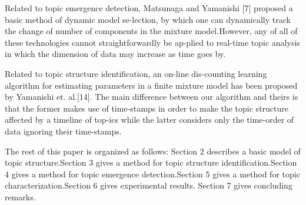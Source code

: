 Related to topic emergence detection, Matsunaga and Yamanishi [7] proposed a basic method of dynamic model se-lection, by which one can dynamically track the change of number of components in the mixture model.However, any of all of these technologies cannot straightforwardly be ap-plied to real-time topic analysis in which the dimension of data may increase as time goes by.

Related to topic structure identification, an on-line dis-counting learning algorithm for estimating parameters in a finite mixture model has been proposed by Yamanishi et. al.[14]. The main difference between our algorithm and theirs is that the former makes use of time-stamps in order to make the topic structure affected by a timeline of top-ics while the latter considers only the time-order of data ignoring their time-stamps.

The rest of this paper is organized as follows: Section 2 describes a basic model of topic structure.Section 3 gives a method for topic structure identification.Section 4 gives a method for topic emergence detection.Section 5 gives a method for topic characterization.Section 6 gives experimental results. Section 7 gives concluding remarks.